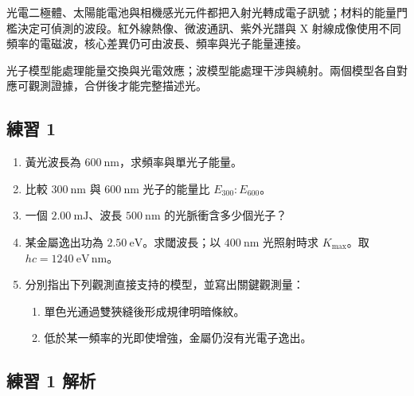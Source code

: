 \documentclass[11pt,a4paper]{article}
\providecommand{\tightlist}{%
  \setlength{\itemsep}{0pt}\setlength{\parskip}{0pt}}
\begin{document}
光電二極體、太陽能電池與相機感光元件都把入射光轉成電子訊號；材料的能量門檻決定可偵測的波段。紅外線熱像、微波通訊、紫外光譜與 X 射線成像使用不同頻率的電磁波，核心差異仍可由波長、頻率與光子能量連接。

光子模型能處理能量交換與光電效應；波模型能處理干涉與繞射。兩個模型各自對應可觀測證據，合併後才能完整描述光。

\subsection{練習 1}\label{ux7df4ux7fd2-1}

\begin{enumerate}
\def\labelenumi{\arabic{enumi}.}
\tightlist
\item
  黃光波長為 \(600\ \mathrm{nm}\)，求頻率與單光子能量。
\item
  比較 \(300\ \mathrm{nm}\) 與 \(600\ \mathrm{nm}\) 光子的能量比 \(E_{300}:E_{600}\)。
\item
  一個 \(2.00\ \mathrm{mJ}\)、波長 \(500\ \mathrm{nm}\) 的光脈衝含多少個光子？
\item
  某金屬逸出功為 \(2.50\ \mathrm{eV}\)。求閾波長；以 \(400\ \mathrm{nm}\) 光照射時求 \(K_{\max}\)。取 \(hc=1240\ \mathrm{eV\,nm}\)。
\item
  分別指出下列觀測直接支持的模型，並寫出關鍵觀測量：

  \begin{enumerate}
  \def\labelenumii{\arabic{enumii}.}
  \tightlist
  \item
    單色光通過雙狹縫後形成規律明暗條紋。
  \item
    低於某一頻率的光即使增強，金屬仍沒有光電子逸出。
  \end{enumerate}
\end{enumerate}

\subsection{練習 1 解析}\label{ux7df4ux7fd2-1-ux89e3ux6790}
\end{document}
